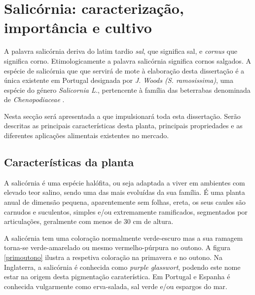 
\chapter{Salicórnia: caracterização, importância e cultivo}

A palavra salicórnia deriva do latim tardio \textit{sal}, que significa sal, e \textit{cornus} que significa corno. Etimologicamente a palavra salicórnia significa cornos salgados\cite{chambers}. A espécie de salicórnia que que servirá de mote à elaboração desta dissertação é a única existente em Portugal designada por \sr \textit{J. Woods (S. ramosissima)}\cite{JoaoSilva}, uma espécie do género \textit{Salicornia L.}, pertencente à família das beterrabas denominada de \textit{Chenopodiaceae} \cite{chenopodiaceae}.

Nesta secção será apresentada a \sr que impulsionará toda esta dissertação. Serão descritas as principais características desta planta, principais propriedades e as diferentes aplicações alimentais existentes no mercado. 

\section{Características da planta}


A salicórnia é uma espécie halófita, ou seja adaptada a viver em ambientes com elevado teor salino\cite{ferri}, sendo uma das mais evoluídas da sua família. É uma planta anual de dimensão pequena, aparentemente sem folhas, ereta, os seus caules são carnudos e suculentos, simples e/ou extremamente ramificados, segmentados por articulações\cite{Silva2000}, geralmente com menos de 30 cm de altura\cite{overviewsal}.

A salicórnia tem uma coloração normalmente verde-escuro mas a sua ramagem torna-se  verde-amarelado ou mesmo vermelho-púrpura no outono\cite{Silva2000}. A figura \ref{primoutono} ilustra a respetiva coloração na primavera e no outono. Na Inglaterra, a salicórnia é conhecida como \textit{purple glasswort}, podendo este nome estar na origem desta pigmentação caraterística\cite{Davy2001}. Em Portugal e Espanha é conhecida vulgarmente como erva-salada, sal verde e/ou espargos do mar\cite{RaquelPinto}. 

